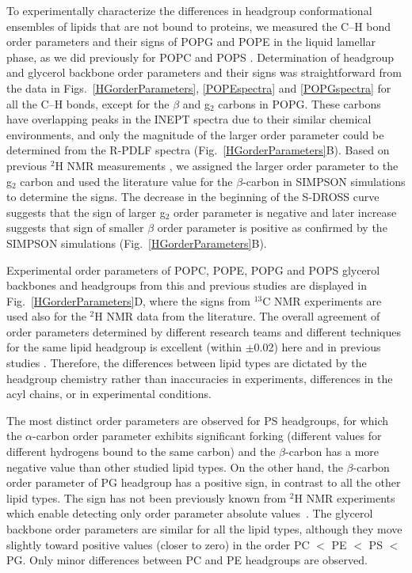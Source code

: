 \documentclass[aps,prl,superscriptaddress,twocolumn]{revtex4}
\begin{document}
To experimentally characterize the differences in headgroup conformational ensembles of lipids that are not
bound to proteins, we measured the C--H bond order parameters
and their signs of POPG and POPE in the liquid lamellar phase, as we did previously for POPC and POPS \cite{ferreira13,ferreira16,antila19}.
Determination of headgroup and glycerol backbone order parameters and their signs
was straightforward from the data in Figs.~\ref{HGorderParameters}, \ref{POPEspectra} and \ref{POPGspectra}
for all the C--H bonds, except for the $\beta$ and g$_2$ carbons in POPG.
These carbons have overlapping peaks in the INEPT spectra due to their similar chemical environments,
and only the magnitude of the larger order parameter could be determined from the R-PDLF spectra (Fig.~\ref{HGorderParameters}B).
Based on previous $^2$H NMR measurements \cite{wohlgemuth80,gally81,borle85},
we assigned the larger order parameter to the g$_2$ carbon
and used the literature value for the $\beta$-carbon in SIMPSON simulations to determine the signs.
The decrease in the beginning of the S-DROSS curve suggests that the sign of larger g$_2$ order parameter
is negative and later increase suggests that sign of smaller $\beta$ order parameter is positive as confirmed by the SIMPSON simulations (Fig.~\ref{HGorderParameters}B).

Experimental order parameters of POPC, POPE, POPG and POPS glycerol backbones and headgroups from this and previous studies are displayed in Fig.~\ref{HGorderParameters}D, where the signs from $^{13}$C NMR experiments are used also for the $^2$H NMR data from the literature. The overall agreement of order parameters determined by different research teams and different techniques for the same lipid headgroup is excellent (within $\pm$0.02) here and in previous studies \cite{botan15,ollila16,antila19}. Therefore, the differences between lipid types are dictated by the headgroup chemistry rather than inaccuracies in experiments, differences in the acyl chains, or in experimental conditions.


The most distinct order parameters are observed for PS headgroups, for which the $\alpha$-carbon order parameter exhibits significant forking (different values for different hydrogens bound to the same carbon) and the $\beta$-carbon has a more negative value than other studied lipid types. On the other hand, the $\beta$-carbon order parameter of PG headgroup has a positive sign, in contrast to all the other lipid types. The sign has not been previously known from $^2$H NMR experiments which enable detecting only order parameter absolute values~\cite{wohlgemuth80,gally81,borle85}. The glycerol backbone order parameters are similar for all the lipid types, although they move slightly toward positive values (closer to zero) in the order PC $<$ PE $<$ PS $<$ PG. Only minor differences between PC and PE headgroups are observed.
\end{document}
